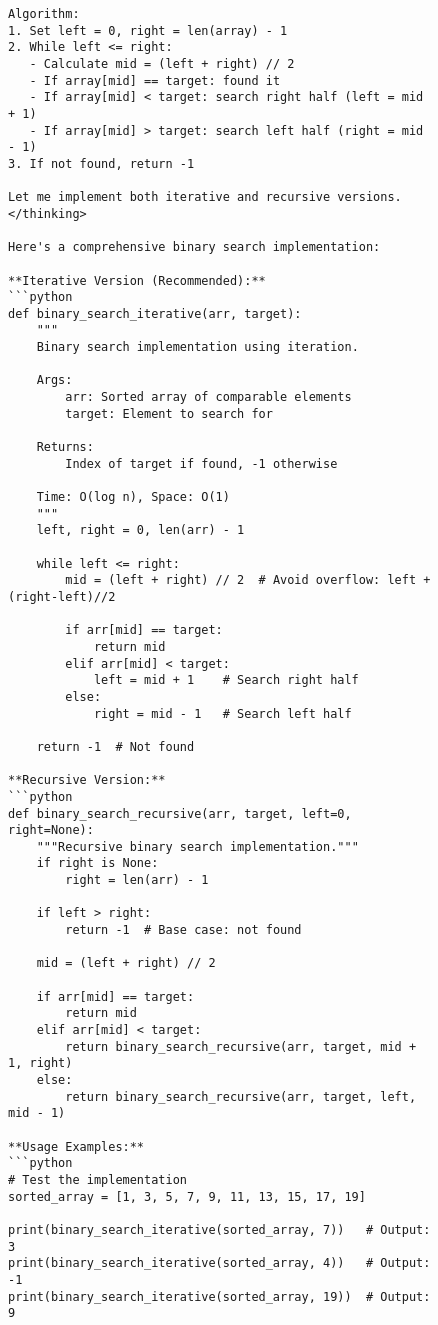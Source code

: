 \begin{table}[H]
\begin{figure}[H]
\begin{lstlisting}[caption=Binary search implementation with reasoning,label=lst:binary-search-example]
Algorithm:
1. Set left = 0, right = len(array) - 1
2. While left <= right:
   - Calculate mid = (left + right) // 2
   - If array[mid] == target: found it
   - If array[mid] < target: search right half (left = mid + 1)
   - If array[mid] > target: search left half (right = mid - 1)
3. If not found, return -1

Let me implement both iterative and recursive versions.
</thinking>

Here's a comprehensive binary search implementation:

**Iterative Version (Recommended):**
```python
def binary_search_iterative(arr, target):
    """
    Binary search implementation using iteration.
    
    Args:
        arr: Sorted array of comparable elements
        target: Element to search for
    
    Returns:
        Index of target if found, -1 otherwise
    
    Time: O(log n), Space: O(1)
    """
    left, right = 0, len(arr) - 1
    
    while left <= right:
        mid = (left + right) // 2  # Avoid overflow: left + (right-left)//2
        
        if arr[mid] == target:
            return mid
        elif arr[mid] < target:
            left = mid + 1    # Search right half
        else:
            right = mid - 1   # Search left half
    
    return -1  # Not found

**Recursive Version:**
```python
def binary_search_recursive(arr, target, left=0, right=None):
    """Recursive binary search implementation."""
    if right is None:
        right = len(arr) - 1
    
    if left > right:
        return -1  # Base case: not found
    
    mid = (left + right) // 2
    
    if arr[mid] == target:
        return mid
    elif arr[mid] < target:
        return binary_search_recursive(arr, target, mid + 1, right)
    else:
        return binary_search_recursive(arr, target, left, mid - 1)

**Usage Examples:**
```python
# Test the implementation
sorted_array = [1, 3, 5, 7, 9, 11, 13, 15, 17, 19]

print(binary_search_iterative(sorted_array, 7))   # Output: 3
print(binary_search_iterative(sorted_array, 4))   # Output: -1
print(binary_search_iterative(sorted_array, 19))  # Output: 9


\end{lstlisting}
\end{figure}
\end{table}

